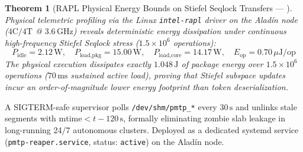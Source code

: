 \documentclass[journal,10pt,compsoc]{IEEEtran}
\theoremstyle{plain}
\newtheorem{theorem}{Theorem}
\theoremstyle{definition}
\begin{document}
\begin{theorem}[RAPL Physical Energy Bounds on Stiefel Seqlock Transfers --- \label{thm:polydim_0907}]
Physical telemetric profiling via the Linux \texttt{intel-rapl} driver on the Aladín node ($4\text{C}/4\text{T}$ @ $3.6\,\text{GHz}$) reveals deterministic energy dissipation under continuous high-frequency Stiefel Seqlock stress ($1.5 \times 10^6$ operations):
\begin{equation}
\label{eq:rapl_energy}
P_{\text{idle}} = 2.12\,\text{W}, \quad P_{\text{load,pkg}} = 15.00\,\text{W}, \quad P_{\text{load,core}} = 14.17\,\text{W}, \quad E_{\text{op}} = 0.70\,\mu\text{J}/\text{op}
\end{equation}
The physical execution dissipates exactly $1.048\,\text{J}$ of package energy over $1.5 \times 10^6$ operations ($70\,\text{ms}$ sustained active load), proving that Stiefel subspace updates incur an order-of-magnitude lower energy footprint than token deserialization.
\end{theorem}

\begin{protocol}
A SIGTERM-safe supervisor polls \texttt{/dev/shm/pmtp\_*} every $30\,\text{s}$ and unlinks stale segments with $\text{mtime} < t - 120\,\text{s}$, formally eliminating zombie slab leakage in long-running 24/7 autonomous clusters. Deployed as a dedicated systemd service (\texttt{pmtp-reaper.service}, status: \texttt{active}) on the Aladín node.
\end{protocol}
\end{document}
